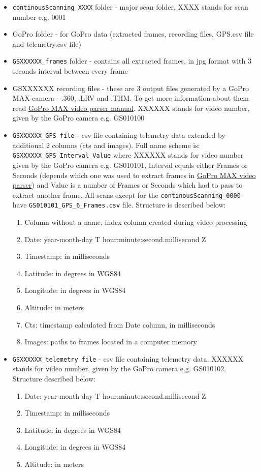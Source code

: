 \documentclass[a4paper,12pt]{book}
\begin{document}
\begin{itemize}
	\item \verb|continousScanning_XXXX| folder - major scan folder, XXXX stands for scan number e.g. 0001
	\item GoPro folder - for GoPro data (extracted frames, recording files, GPS.csv file and telemetry.csv file)
	\item \verb|GSXXXXXX_frames| folder - contains all extracted frames, in jpg format with 3 seconds interval between every frame
	\item GSXXXXXX recording files - these are 3 output files generated by a GoPro MAX camera - .360, .LRV and .THM. To get more information about them read \href{https://github.com/miloszwojciechowski/Warsaw-model/tree/main/Manuals/GoPro_MAX_video_parser}{GoPro MAX video parser manual}. XXXXXX stands for video number, given by the GoPro camera e.g. GS010100
	\pagebreak
	\item \verb|GSXXXXXX_GPS file| - csv file containing telemetry data extended by additional 2 columns (cts and images). Full name scheme is: \verb|GSXXXXXX_GPS_Interval_Value| where  XXXXXX stands for video number given by the GoPro camera e.g. GS010101, Interval equals either Frames or Seconds (depends which one was used to extract frames in \href{https://github.com/miloszwojciechowski/Warsaw-model/tree/main/GoPro_MAX_video_parser}{GoPro MAX video parser}) and Value is a number of Frames or Seconds which had to pass to extract another frame. All scans except for the \verb|continousScanning_0000| have \verb|GS010101_GPS_6_Frames.csv| file. Structure is described below:
	\begin{enumerate}
		\item Column without a name, index column created during video processing
		\item Date: year-month-day T hour:minute:second.millisecond Z
		\item Timestamp: in milliseconds
		\item Latitude: in degrees in WGS84
		\item Longitude: in degrees in WGS84
		\item Altitude: in meters
		\item Cts: timestamp calculated from Date column, in milliseconds
		\item Images: paths to frames located in a computer memory
	\end{enumerate}
	\item \verb|GSXXXXXX_telemetry file| - csv file containing telemetry data.  XXXXXX stands for video number, given by the GoPro camera e.g. GS010102. Structure described below:
	\begin{enumerate}
		\item Date: year-month-day T hour:minute:second.millisecond Z
		\item Timestamp: in milliseconds
		\item Latitude: in degrees in WGS84
		\item Longitude: in degrees in WGS84
		\item Altitude: in meters
	\end{enumerate}
\end{itemize}
\end{document}
